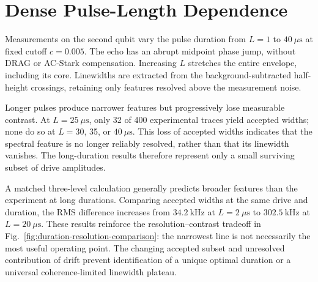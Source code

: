 \section{Dense Pulse-Length Dependence}
\label{sec:dense-pulse-length}

Measurements on the second qubit vary the pulse duration from
$L=1$ to $40~\mu\mathrm{s}$ at fixed cutoff $c=0.005$.
The echo has an abrupt midpoint phase jump, without DRAG or AC-Stark
compensation. Increasing $L$ stretches the entire envelope, including its
core. Linewidths are extracted from the background-subtracted half-height
crossings, retaining only features resolved above the measurement noise.

Longer pulses produce narrower features but progressively lose measurable
contrast. At $L=25~\mu\mathrm{s}$, only 32 of 400 experimental traces yield
accepted widths; none do so at $L=30$, 35, or $40~\mu\mathrm{s}$.
This loss of accepted widths indicates that the spectral feature is no
longer reliably resolved, rather than that its linewidth vanishes.
The long-duration results therefore represent only a small surviving
subset of drive amplitudes.

A matched three-level calculation generally predicts broader features than
the experiment at long durations. Comparing accepted widths at the same
drive and duration, the RMS difference increases from
$34.2~\mathrm{kHz}$ at $L=2~\mu\mathrm{s}$ to $302.5~\mathrm{kHz}$ at
$L=20~\mu\mathrm{s}$. These results reinforce the resolution--contrast
tradeoff in Fig.~\ref{fig:duration-resolution-comparison}: the narrowest
line is not necessarily the most useful operating point.
The changing accepted subset and unresolved contribution of drift prevent
identification of a unique optimal duration or a universal
coherence-limited linewidth plateau.
